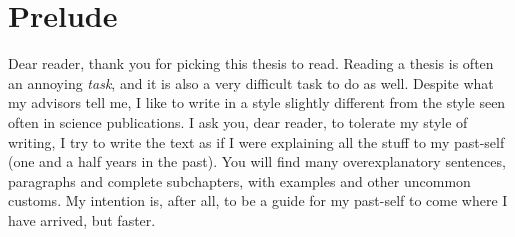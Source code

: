 \chapter*{Prelude}\label{prelude}

Dear reader, thank you for picking this thesis to read. Reading a thesis
is often an annoying \emph{task}, and it is also a very difficult task
to do as well. Despite what my advisors tell me, I like to write in a
style slightly different from the style seen often in science
publications. I ask you, dear reader, to tolerate my style of writing, I
try to write the text as if I were explaining all the stuff to my
past-self (one and a half years in the past). You will find many
overexplanatory sentences, paragraphs and complete subchapters, with
examples and other uncommon customs. My intention is, after all, to be a
guide for my past-self to come where I have arrived, but faster.

